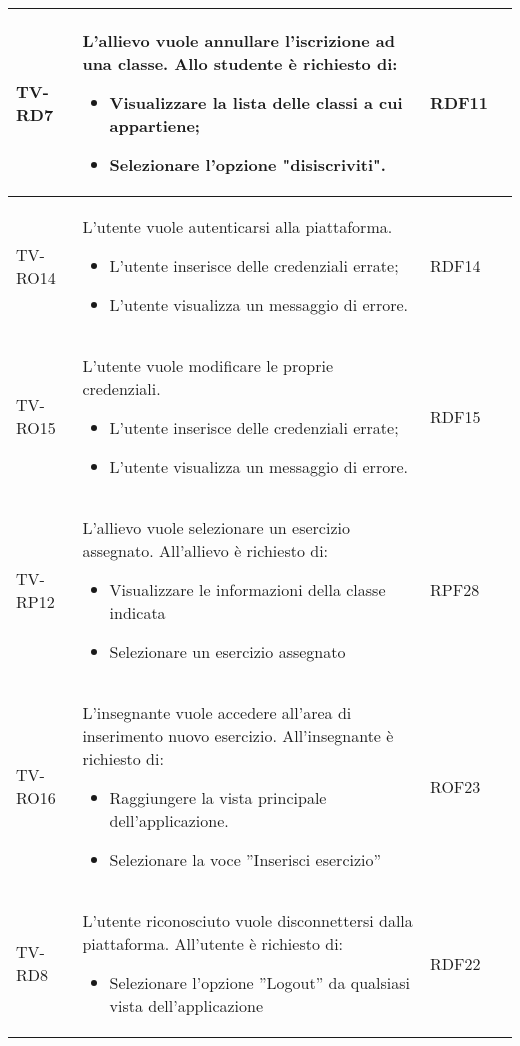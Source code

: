 \begin{longtable}{|>{\centering\arraybackslash}m{1.6cm}|>{\centering\arraybackslash}m{6.41cm}|>{\centering\arraybackslash}m{3.1cm} | >{\centering\arraybackslash}m{2.6cm}|}
		TV-RD7 & L'allievo vuole annullare l'iscrizione ad una classe. Allo studente è richiesto di:
		\begin{itemize}
			\item Visualizzare la lista delle classi a cui appartiene;
			\item Selezionare l'opzione "disiscriviti".		
		\end{itemize}  & RDF11 \\ \hline
		
		  \rowcolor{LightGray}
		TV-RO14 & L'utente vuole autenticarsi alla piattaforma. 
		\begin{itemize}
			\item L'utente inserisce delle credenziali errate;
			\item L'utente visualizza un messaggio di errore.
		\end{itemize}  & RDF14 \\ \hline
		
		TV-RO15 & L'utente vuole modificare le proprie credenziali. 
		\begin{itemize}
			\item L'utente inserisce delle credenziali errate;
			\item L'utente visualizza un messaggio di errore.
		\end{itemize}  & RDF15 \\ \hline
		
		  \rowcolor{LightGray}
  TV-RP12 & L’allievo vuole selezionare un esercizio assegnato. All'allievo è richiesto di:
  \begin{itemize}
   \item Visualizzare le informazioni della classe indicata
   \item Selezionare un esercizio assegnato
  \end{itemize}  & RPF28 \\ \hline

 TV-RO16 & L’insegnante vuole accedere all’area di inserimento nuovo esercizio. All'insegnante è richiesto di:
 \begin{itemize}
  \item Raggiungere la vista principale dell’applicazione.
  \item Selezionare la voce ”Inserisci esercizio”
 \end{itemize}  & ROF23 \\ \hline
  \rowcolor{LightGray}
  TV-RD8 & L’utente riconosciuto vuole disconnettersi dalla piattaforma. All'utente è richiesto di:
  \begin{itemize}
   \item Selezionare l’opzione ”Logout” da qualsiasi vista dell'applicazione
  \end{itemize}  & RDF22 \\ \hline
 

\end{longtable}
